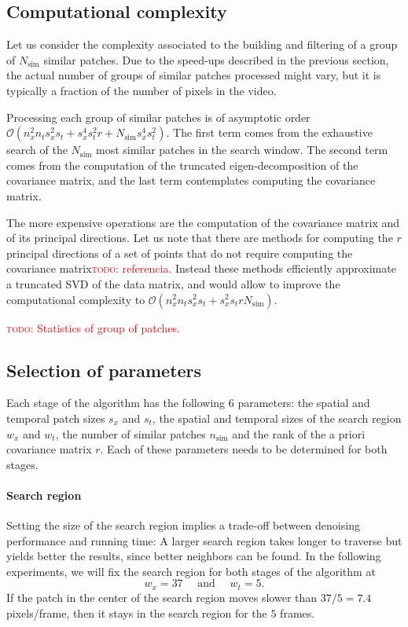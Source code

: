 \documentclass[10pt, journal, twocolumn, final, a4paper]{IEEEtran}
\newcommand{\todo}[1]{\textcolor{red}{\noindent\textsc{todo}: #1}}
\begin{document}
\subsection{Computational complexity}
\label{sec:complexity}

Let us consider the complexity associated to the building and filtering of a
group of $N_{\text{sim}}$ similar patches. Due to the speed-ups described in
the previous section, the actual number of groups of similar patches processed
might vary, but it is typically a fraction of the number of pixels in the video.

Processing each group of similar patches is of asymptotic order $\mathcal
O(n_x^2 n_t s_x^2 s_t + s_x^4s_t^2r + N_{\text{sim}}s_x^4s_t^2)$.
The first term comes from the exhaustive search of the $N_{\text{sim}}$ most
similar patches in the search window. 
The second term comes from the computation of the truncated eigen-decomposition
of the covariance matrix, and the last term contemplates computing the
covariance matrix.

The more expensive operations are the computation of the covariance matrix and
of its principal directions.
Let us note that there are methods for computing the $r$ principal directions
of a set of points that do not require computing the covariance matrix\todo{referencia}. Instead
these methods efficiently approximate a truncated SVD of the data matrix, and would 
allow to improve the computational complexity to $\mathcal O(n_x^2 n_t s_x^2
s_t + s_x^2s_trN_{\text{sim}})$.

\todo{Statistics of group of patches.}

\subsection{Selection of parameters}
\label{sec:parameters}

Each stage of the algorithm has the following 6 parameters: the spatial and temporal patch sizes
$s_x$ and $s_t$, the spatial and temporal sizes of the search region $w_x$ and
$w_t$, the number of similar patches $n_{\text{sim}}$ and the rank of the a priori
covariance matrix $r$. Each of these parameters needs to be determined for both
stages.

\paragraph{Search region} Setting the size of the search region implies a
trade-off between denoising performance and running time: A larger search
region takes longer to traverse but yields better the results, since better
neighbors can be found. In the following experiments, we will fix the search
region for both stages of the algorithm at 
\begin{equation}
w_x = 37 \quad \text{ and } \quad w_t = 5.
\label{eq:search_region_parameters}
\end{equation}
If the patch in the center of the search region moves slower than $37/5 = 7.4$
pixels/frame, then it stays in the search region for the $5$ frames.
\end{document}
